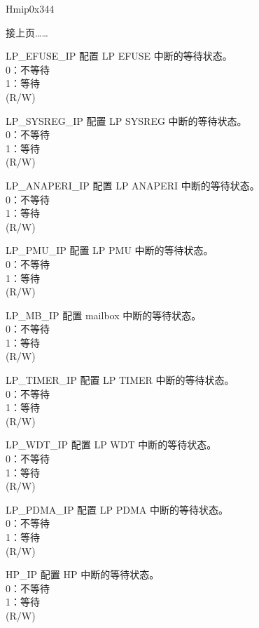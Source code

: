 \begin{register}{H}{mip}{0x344}
\begin{regdesc}\begin{reglist}
\item [接上页……]
\label{fielddesc:LPMIPEFUSEIP}\item [LP\_EFUSE\_IP] 配置 LP EFUSE 中断的等待状态。\\
0：不等待\\
1：等待\\(R/W)
\label{fielddesc:LPMIPSYSREGIP}\item [LP\_SYSREG\_IP] 配置 LP SYSREG 中断的等待状态。\\
0：不等待\\
1：等待\\(R/W)
\label{fielddesc:LPMIPANAPERIIP}\item [LP\_ANAPERI\_IP] 配置 LP ANAPERI 中断的等待状态。\\
0：不等待\\
1：等待\\(R/W)
\label{fielddesc:LPMIPPMUIP}\item [LP\_PMU\_IP] 配置 LP PMU 中断的等待状态。\\
0：不等待\\
1：等待\\(R/W)
\label{fielddesc:LPMIPMBIP}\item [LP\_MB\_IP] 配置 mailbox 中断的等待状态。\\
0：不等待\\
1：等待\\(R/W)
\label{fielddesc:LPMIPTIMERIP}\item [LP\_TIMER\_IP] 配置 LP TIMER 中断的等待状态。\\
0：不等待\\
1：等待\\(R/W)
\label{fielddesc:LPMIPWDTIP}\item [LP\_WDT\_IP] 配置 LP WDT 中断的等待状态。\\
0：不等待\\
1：等待\\(R/W)
\label{fielddesc:LPMIPPDMAIP}\item [LP\_PDMA\_IP] 配置 LP PDMA 中断的等待状态。\\
0：不等待\\
1：等待\\(R/W)
\label{fielddesc:LPMIPHPIP}\item [HP\_IP] 配置 HP 中断的等待状态。\\
0：不等待\\
1：等待\\(R/W)
\end{reglist}\end{regdesc}
\end{register}

